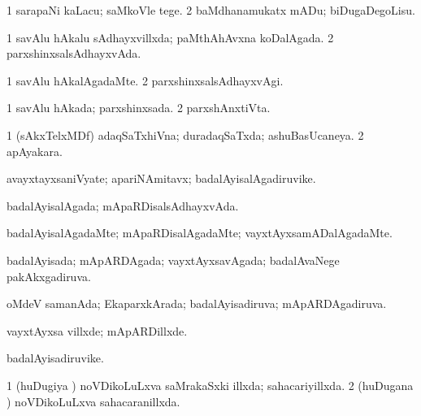 {\bentry
{} 
\gl{\sakirx}
\expl{}
\bmng
\bnum
\num{1} sarapaNi kaLacu; saMkoVle tege. 
\num{2} baMdhanamukatx mADu; biDugaDegoLisu. 
\enum
\emng
\eentry

\bentry
{} 
\gl{\gu}
\expl{}
\bmng
\bnum
\num{1} savAlu hAkalu sAdhayxvillxda; paMthAhAvxna koDalAgada. 
\num{2} parxshinxsalsAdhayxvAda. 
\enum
\emng
\eentry

\bentry
{} 
\gl{\kirxvi}
\expl{}
\bmng
\bnum
\num{1} savAlu hAkalAgadaMte. 
\num{2} parxshinxsalsAdhayxvAgi. 
\enum
\emng
\eentry

\bentry
{} 
\gl{\gu}
\expl{}
\bmng
\bnum
\num{1} savAlu hAkada; parxshinxsada. 
\num{2} parxshAnxtiVta. 
\enum
\emng
\eentry

\bentry
{} 
\gl{\gu}
\bmng
\bnum
\num{1} (sAkxTelxMDf) adaqSaTxhiVna; duradaqSaTxda; ashuBasUcaneya. 
\num{2} apAyakara. 
\enum
\emng
\eentry

\bentry
{} 
\gl{\nA}
\expl{}
\bmng
avayxtayxsaniVyate; apariNAmitavx; badalAyisalAgadiruvike. 
\emng
\eentry

\bentry
{} 
\gl{\gu}
\expl{}
\bmng
badalAyisalAgada; mApaRDisalsAdhayxvAda. 
\emng
\eentry

\bentry
{} 
\gl{\nA}
\expl{}
\bmng
{} 
\emng
\eentry

\bentry
{} 
\gl{\kirxvi}
\expl{}
\bmng
badalAyisalAgadaMte; mApaRDisalAgadaMte; vayxtAyxsamADalAgadaMte. 
\emng
\eentry

\bentry
{} 
\gl{\gu}
\expl{}
\bmng
badalAyisada; mApARDAgada; vayxtAyxsavAgada; badalAvaNege pakAkxgadiruva. 
\emng
\eentry

\bentry
{} 
\gl{\gu}
\expl{}
\bmng
oMdeV samanAda; EkaparxkArada; badalAyisadiruva; mApARDAgadiruva. 
\emng
\eentry

\bentry
{} 
\gl{\kirxvi}
\expl{}
\bmng
vayxtAyxsa villxde; mApARDillxde. 
\emng
\eentry

\bentry
{} 
\gl{\nA}
\expl{}
\bmng
badalAyisadiruvike. 
\emng
\eentry

\bentry
{} 
\gl{\gu}
\expl{}
\bmng
\bnum
\num{1} (huDugiya \vi) noVDikoLuLxva saMrakaSxki illxda; sahacariyillxda. 
\num{2} (huDugana \vi) noVDikoLuLxva sahacaranillxda. 
\enum
\emng
\eentry

}
